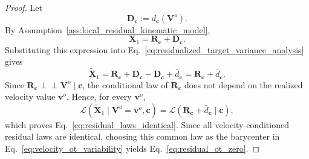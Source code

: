\documentclass{article} %
\begin{document}
\begin{proof}
Let
\[
    \mathbf D_{\mathbf c}
    :=
    d_{\mathbf c}(\mathbf V^{o}).
\]
By Assumption~\ref{ass:local_residual_kinematic_model},
\[
    \mathbf X_1
    =
    \mathbf R_{\mathbf c}
    +
    \mathbf D_{\mathbf c}.
\]
Substituting this expression into
Eq.~\eqref{eq:residualized_target_variance_analysis} gives
\[
    \widetilde{\mathbf X}_1
    =
    \mathbf R_{\mathbf c}
    +
    \mathbf D_{\mathbf c}
    -
    \mathbf D_{\mathbf c}
    +
    \bar d_{\mathbf c}
    =
    \mathbf R_{\mathbf c}
    +
    \bar d_{\mathbf c}.
\]
Since
$\mathbf R_{\mathbf c}\perp\!\!\!\perp \mathbf V^{o}\mid\mathbf c$, the
conditional law of $\mathbf R_{\mathbf c}$ does not depend on the realized
velocity value $\mathbf v^{o}$. Hence, for every $\mathbf v^{o}$,
\[
    \mathcal L
    \left(
        \widetilde{\mathbf X}_1
        \mid
        \mathbf V^{o}=\mathbf v^{o},
        \mathbf c
    \right)
    =
    \mathcal L
    \left(
        \mathbf R_{\mathbf c}
        +
        \bar d_{\mathbf c}
        \mid
        \mathbf c
    \right),
\]
which proves Eq.~\eqref{eq:residual_laws_identical}. Since all
velocity-conditioned residual laws are identical, choosing this common law as
the barycenter in Eq.~\eqref{eq:velocity_ot_variability} yields
Eq.~\eqref{eq:residual_ot_zero}.


\end{proof}
\end{document}
